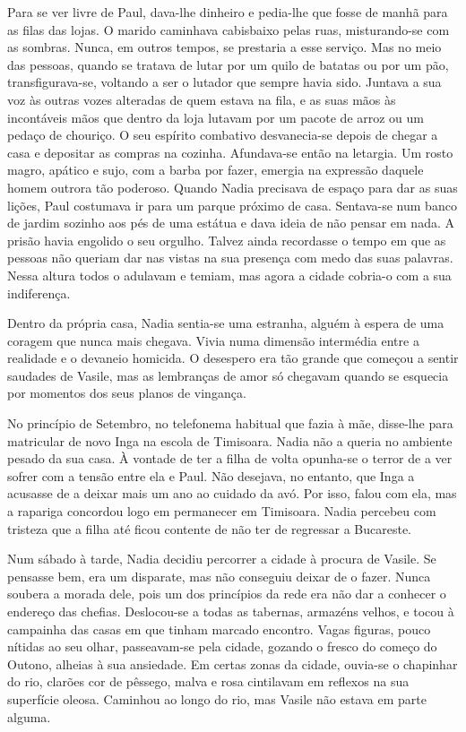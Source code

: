 Para se ver livre de Paul, dava-lhe dinheiro e pedia-lhe que fosse de
manhã para as filas das lojas. O marido caminhava cabisbaixo pelas
ruas, misturando-se com as sombras. Nunca, em outros tempos, se
prestaria a esse serviço. Mas no meio das pessoas, quando se tratava de
lutar por um quilo de batatas ou por um pão, transfigurava-se, voltando
a ser o lutador que sempre havia sido. Juntava a sua voz às outras vozes
alteradas de quem estava na fila, e as suas mãos às incontáveis mãos que
dentro da loja lutavam por um pacote de arroz ou um pedaço de
chouriço. O seu espírito combativo desvanecia-se depois de chegar a
casa e depositar as compras na cozinha. Afundava-se então na letargia.
Um rosto magro, apático e sujo, com a barba por fazer, emergia na
expressão daquele homem outrora tão poderoso. Quando Nadia precisava de
espaço para dar as suas lições, Paul costumava ir para um parque próximo
de casa. Sentava-se num banco de jardim sozinho aos pés de uma estátua e
dava ideia de não pensar em nada. A prisão havia engolido o seu orgulho.
Talvez ainda recordasse o tempo em que as pessoas não queriam dar nas
vistas na sua presença com medo das suas palavras. Nessa altura todos o
adulavam e temiam, mas agora a cidade
cobria-o com a sua indiferença.

Dentro da própria casa, Nadia sentia-se uma estranha, alguém à espera de
uma coragem que nunca mais chegava. Vivia numa dimensão intermédia entre
a realidade e o devaneio homicida. O desespero era tão grande que começou a sentir saudades de Vasile, mas as lembranças de amor só chegavam
quando se esquecia por momentos dos seus planos de vingança.

No princípio de Setembro, no telefonema habitual que fazia à mãe,
disse-lhe para matricular de novo Inga na escola de Timisoara. Nadia não
a queria no ambiente pesado da sua casa. À vontade de ter a filha de
volta opunha-se o terror de a ver sofrer com a tensão entre ela e Paul.
Não desejava, no entanto, que Inga a acusasse de a deixar mais um ano ao
cuidado da avó. Por isso, falou com ela, mas a rapariga concordou logo
em permanecer em Timisoara. Nadia percebeu com tristeza que a filha até
ficou contente de não ter de regressar a Bucareste.

Num sábado à tarde, Nadia decidiu percorrer a cidade à procura de
Vasile. Se pensasse bem, era um disparate, mas não conseguiu deixar de o
fazer. Nunca soubera a morada dele, pois um dos princípios da rede era
não dar a conhecer o endereço das chefias. Deslocou-se a todas as
tabernas, armazéns velhos, e tocou à campainha das casas em que tinham
marcado encontro. Vagas figuras, pouco nítidas ao seu olhar,
passeavam-se pela cidade, gozando o fresco do começo do Outono, alheias
à sua ansiedade. Em certas zonas da cidade, ouvia-se o chapinhar do rio,
clarões cor de pêssego, malva e rosa cintilavam em reflexos na sua
superfície oleosa. Caminhou ao longo do rio, mas Vasile não estava em
parte alguma.

